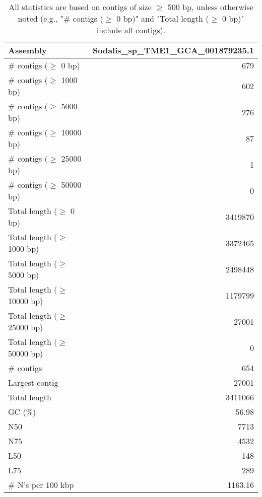 \documentclass[12pt,a4paper]{article}
\begin{document}
\begin{table}[ht]
\begin{center}
\caption{All statistics are based on contigs of size $\geq$ 500 bp, unless otherwise noted (e.g., "\# contigs ($\geq$ 0 bp)" and "Total length ($\geq$ 0 bp)" include all contigs).}
\begin{tabular}{|l*{1}{|r}|}
\hline
Assembly & Sodalis\_sp\_TME1\_GCA\_001879235.1 \\ \hline
\# contigs ($\geq$ 0 bp) & 679 \\ \hline
\# contigs ($\geq$ 1000 bp) & 602 \\ \hline
\# contigs ($\geq$ 5000 bp) & 276 \\ \hline
\# contigs ($\geq$ 10000 bp) & 87 \\ \hline
\# contigs ($\geq$ 25000 bp) & 1 \\ \hline
\# contigs ($\geq$ 50000 bp) & 0 \\ \hline
Total length ($\geq$ 0 bp) & 3419870 \\ \hline
Total length ($\geq$ 1000 bp) & 3372465 \\ \hline
Total length ($\geq$ 5000 bp) & 2498448 \\ \hline
Total length ($\geq$ 10000 bp) & 1179799 \\ \hline
Total length ($\geq$ 25000 bp) & 27001 \\ \hline
Total length ($\geq$ 50000 bp) & 0 \\ \hline
\# contigs & 654 \\ \hline
Largest contig & 27001 \\ \hline
Total length & 3411066 \\ \hline
GC (\%) & 56.98 \\ \hline
N50 & 7713 \\ \hline
N75 & 4532 \\ \hline
L50 & 148 \\ \hline
L75 & 289 \\ \hline
\# N's per 100 kbp & 1163.16 \\ \hline
\end{tabular}
\end{center}
\end{table}
\end{document}
